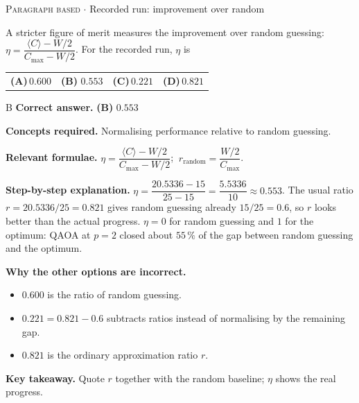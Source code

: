 \documentclass[11pt,a4paper]{article}
\newcommand{\optlabel}[1]{\textbf{(#1)}}
\newcommand{\correctlabel}[1]{\textcolor{okgreen}{\textbf{(#1)}\,\ding{51}}}
\newenvironment{qitem}[1]{\begin{list}{}{\setlength{\leftmargin}{3.3em}\setlength{\labelwidth}{3.1em}%
  \setlength{\labelsep}{0.2em}\setlength{\topsep}{3pt}\setlength{\parsep}{3pt}}\item[\textbf{Q.#1}\hfill]}{\end{list}}
\newcommand{\qsep}{\par\vspace{2pt}{\color{black!15}\hrule}\vspace{4pt}}
\newcommand{\qmeta}[2]{{\footnotesize\color{black!60}\textsc{#1} \;$\cdot$\; #2}\par}
\begin{document}
\begin{qitem}{80}
\qmeta{Paragraph based}{Recorded run: improvement over random}
A stricter figure of merit measures the improvement over random guessing:
$\eta = \dfrac{\langle C\rangle - W/2}{C_{\max} - W/2}$. For the recorded run, $\eta$ is
\par\smallskip\noindent\begin{tabularx}{\linewidth}{@{}*{4}{L}@{}}
\optlabel{A}\,$0.600$ & \correctlabel{B}\,$0.553$ & \optlabel{C}\,$0.221$ & \optlabel{D}\,$0.821$
\end{tabularx}
\end{qitem}
\begin{solbox}{B}
\textbf{\color{brand}Correct answer.} \textcolor{okgreen}{\textbf{(B)}} $0.553$

\textbf{\color{brand}Concepts required.} Normalising performance relative to random guessing.

\textbf{\color{brand}Relevant formulae.} $\eta = \dfrac{\langle C\rangle - W/2}{C_{\max} - W/2}$; $\ r_{\text{random}} = \dfrac{W/2}{C_{\max}}$.

\textbf{\color{brand}Step-by-step explanation.} $\eta = \dfrac{20.5336 - 15}{25 - 15} = \dfrac{5.5336}{10} \approx 0.553$.
The usual ratio $r = 20.5336/25 = 0.821$ gives random guessing already $15/25 = 0.6$, so $r$ looks better than the actual
progress. $\eta = 0$ for random guessing and $1$ for the optimum: QAOA at $p = 2$ closed about $55\,\%$ of the gap between random
guessing and the optimum.

\textbf{\color{brand}Why the other options are incorrect.}
\begin{itemize}[leftmargin=2.4em, itemsep=1pt, topsep=2pt]
\item[\textbf{(A)}] $0.600$ is the ratio of random guessing.
\item[\textbf{(C)}] $0.221 = 0.821 - 0.6$ subtracts ratios instead of normalising by the remaining gap.
\item[\textbf{(D)}] $0.821$ is the ordinary approximation ratio $r$.
\end{itemize}
\textbf{\color{brand}Key takeaway.} Quote $r$ together with the random baseline; $\eta$ shows the real progress.
\end{solbox}
\qsep
\end{document}
